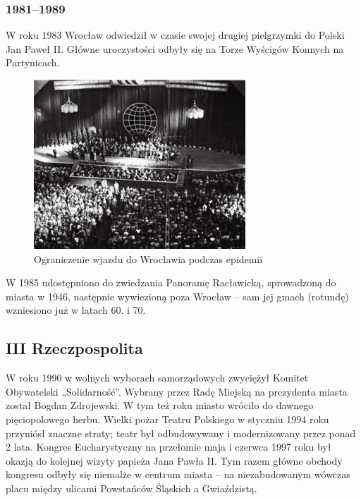 \documentclass{article}
\begin{document}
\subsubsection{1981–1989}
W roku 1983 Wrocław odwiedził w czasie swojej drugiej pielgrzymki do Polski Jan Paweł II. Główne uroczystości odbyły się na Torze Wyścigów Konnych na Partynicach.
\bigskip
\newline
\begin{figure}[h]
\centering
\includegraphics[scale=0.5]{18.png}
\caption{Ograniczenie wjazdu do Wrocławia podczas epidemii}
\end{figure}
\bigskip
\newline
W 1985 udostępniono do zwiedzania Panoramę Racławicką, sprowadzoną do miasta w 1946, następnie wywiezioną poza Wrocław – sam jej gmach (rotundę) wzniesiono już w latach 60. i 70.
\subsection{III Rzeczpospolita}
W roku 1990 w wolnych wyborach samorządowych zwyciężył Komitet Obywatelski „Solidarność”. Wybrany przez Radę Miejską na prezydenta miasta został Bogdan Zdrojewski. W tym też roku miasto wróciło do dawnego pięciopolowego herbu.
\bigskip
\newline
Wielki pożar Teatru Polskiego w styczniu 1994 roku przyniósł znaczne straty; teatr był odbudowywany i modernizowany przez ponad 2 lata.
\bigskip
\newline
Kongres Eucharystyczny na przełomie maja i czerwca 1997 roku był okazją do kolejnej wizyty papieża Jana Pawła II. Tym razem główne obchody kongresu odbyły się niemalże w centrum miasta – na niezabudowanym wówczas placu między ulicami Powstańców Śląskich a Gwiaździstą.
\end{document}
